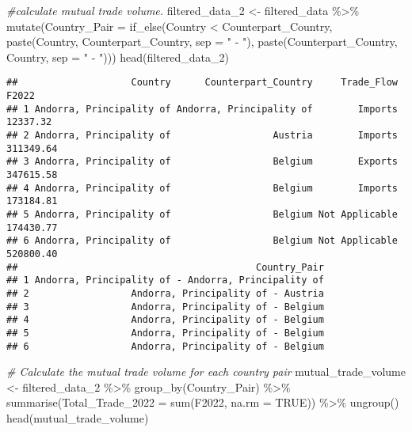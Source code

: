 \documentclass[
]{article}
\newenvironment{Shaded}{\begin{snugshade}}{\end{snugshade}}
\newcommand{\AttributeTok}[1]{\textcolor[rgb]{0.77,0.63,0.00}{#1}}
\newcommand{\CommentTok}[1]{\textcolor[rgb]{0.56,0.35,0.01}{\textit{#1}}}
\newcommand{\ConstantTok}[1]{\textcolor[rgb]{0.00,0.00,0.00}{#1}}
\newcommand{\FunctionTok}[1]{\textcolor[rgb]{0.00,0.00,0.00}{#1}}
\newcommand{\NormalTok}[1]{#1}
\newcommand{\OtherTok}[1]{\textcolor[rgb]{0.56,0.35,0.01}{#1}}
\newcommand{\SpecialCharTok}[1]{\textcolor[rgb]{0.00,0.00,0.00}{#1}}
\newcommand{\StringTok}[1]{\textcolor[rgb]{0.31,0.60,0.02}{#1}}
\begin{document}
\begin{Shaded}
\begin{Highlighting}[]
\CommentTok{\#calculate mutual trade volume.}
\NormalTok{filtered\_data\_2 }\OtherTok{\textless{}{-}}\NormalTok{ filtered\_data }\SpecialCharTok{\%\textgreater{}\%}
  \FunctionTok{mutate}\NormalTok{(}\AttributeTok{Country\_Pair =} \FunctionTok{if\_else}\NormalTok{(Country }\SpecialCharTok{\textless{}}\NormalTok{ Counterpart\_Country,}
                                \FunctionTok{paste}\NormalTok{(Country, Counterpart\_Country, }\AttributeTok{sep =} \StringTok{" {-} "}\NormalTok{),}
                                \FunctionTok{paste}\NormalTok{(Counterpart\_Country, Country, }\AttributeTok{sep =} \StringTok{" {-} "}\NormalTok{)))}
\FunctionTok{head}\NormalTok{(filtered\_data\_2)}
\end{Highlighting}
\end{Shaded}

\begin{verbatim}
##                    Country      Counterpart_Country     Trade_Flow     F2022
## 1 Andorra, Principality of Andorra, Principality of        Imports  12337.32
## 2 Andorra, Principality of                  Austria        Imports 311349.64
## 3 Andorra, Principality of                  Belgium        Exports 347615.58
## 4 Andorra, Principality of                  Belgium        Imports 173184.81
## 5 Andorra, Principality of                  Belgium Not Applicable 174430.77
## 6 Andorra, Principality of                  Belgium Not Applicable 520800.40
##                                          Country_Pair
## 1 Andorra, Principality of - Andorra, Principality of
## 2                  Andorra, Principality of - Austria
## 3                  Andorra, Principality of - Belgium
## 4                  Andorra, Principality of - Belgium
## 5                  Andorra, Principality of - Belgium
## 6                  Andorra, Principality of - Belgium
\end{verbatim}

\begin{Shaded}
\begin{Highlighting}[]
\CommentTok{\# Calculate the mutual trade volume for each country pair}
\NormalTok{mutual\_trade\_volume }\OtherTok{\textless{}{-}}\NormalTok{ filtered\_data\_2 }\SpecialCharTok{\%\textgreater{}\%}
  \FunctionTok{group\_by}\NormalTok{(Country\_Pair) }\SpecialCharTok{\%\textgreater{}\%}
  \FunctionTok{summarise}\NormalTok{(}\AttributeTok{Total\_Trade\_2022 =} \FunctionTok{sum}\NormalTok{(F2022, }\AttributeTok{na.rm =} \ConstantTok{TRUE}\NormalTok{)) }\SpecialCharTok{\%\textgreater{}\%}
  \FunctionTok{ungroup}\NormalTok{()}
\FunctionTok{head}\NormalTok{(mutual\_trade\_volume)}
\end{Highlighting}
\end{Shaded}
\end{document}
